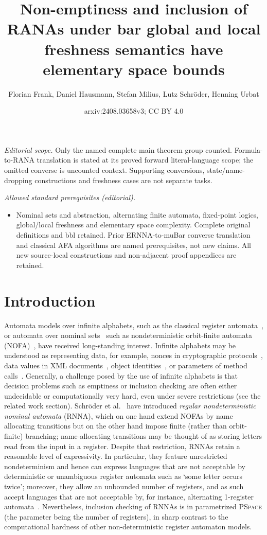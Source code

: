 \documentclass[10pt,a4paper]{amsart}
\title{Non-emptiness and inclusion of RANAs under bar global and local freshness semantics have elementary space bounds}
\author{Florian Frank, Daniel Hausmann, Stefan Milius, Lutz Schröder, Henning Urbat}
\date{arxiv:2408.03658v3; CC BY 4.0}
\theoremstyle{definition}
\newcommand{\PSPACE}{\textsc{PSpace}\xspace}
\begin{document}
\maketitle
\noindent\textit{Editorial scope.} Only the named complete main theorem group counted. Formula-to-RANA translation is stated at its proved forward literal-language scope; the omitted converse is uncounted context. Supporting conversions, state/name-dropping constructions and freshness cases are not separate tasks.\par\medskip
\noindent\textit{Allowed standard prerequisites (editorial).}\begin{itemize}
\item Nominal sets and abstraction, alternating finite automata, fixed-point logics, global/local freshness and elementary space complexity. Complete original definitions and bbl retained. Prior ERNNA-to-muBar converse translation and classical AFA algorithms are named prerequisites, not new claims. All new source-local constructions and non-adjacent proof appendices are retained.
\end{itemize}\medskip
\section{Introduction}\label{sec:intro}

Automata models over infinite alphabets, such as the classical register
automata~\cite{KaminskiFrancez94}, or automata over nominal sets~\cite{Pitts2013} such as
nondeterministic orbit-finite automata (NOFA)~\cite{BojanczykEA14}, have received long-standing
interest.  Infinite alphabets may be understood as representing data, for example, nonces in
cryptographic protocols~\cite{KurtzEA07}, data values in XML documents~\cite{NevenEA04}, object
identities~\cite{GrigoreEA13}, or parameters of method calls~\cite{HowarEA19}.  Generally, a
challenge posed by the use of infinite alphabets is that decision problems such as emptiness or
inclusion checking are often either undecidable or computationally very hard, even under severe
restrictions (see the related work section).  Schröder et al.~\cite{skmw17} have introduced
\emph{regular nondeterministic nominal automata} (RNNA), which on one hand extend NOFAs by name
allocating transitions but on the other hand impose finite (rather than orbit-finite)
branching; name-allocating transitions may be thought of as storing letters read from the input
in a register. Despite that restriction, RNNAs retain a reasonable level of expressivity. In
particular, they feature unrestricted nondeterminism and hence can express languages that are
not acceptable by deterministic or unambiguous register automata such as `some letter occurs
twice'; moreover, they allow an unbounded number of registers, and as such accept languages
that are not acceptable by, for instance, alternating 1-register
automata~\cite{skmw17}. Nevertheless, inclusion checking of RNNAs is in parametrized \PSPACE
(the parameter being the number of registers), in sharp contrast to the computational hardness
of other non-deterministic register automaton models.
\end{document}
